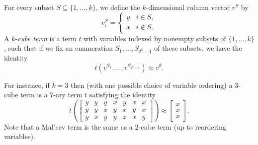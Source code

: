 \begin{defn} For every subset $S \subseteq \{1, ..., k\}$, we define the $k$-dimensional column vector $v^S$ by
\[
v^S_i = \begin{cases} y & i \in S,\\ x & i \not\in S.\end{cases}
\]
A $k$-\emph{cube term} is a term $t$ with variables indexed by nonempty subsets of $\{1, ..., k\}$, such that if we fix an enumeration $S_1, ..., S_{2^k-1}$ of these subsets, we have the identity
\[
t(v^{S_1}, ..., v^{S_{2^k-1}}) \approx v^{\emptyset}.
\]
\end{defn}

For instance, if $k = 3$ then (with one possible choice of variable ordering) a $3$-cube term is a $7$-ary term $t$ satisfying the identity
\[
t\left(\begin{bmatrix} y & y & y & x & y & x & x\\ y & y & x & y & x & y & x\\ y & x & y & y & x & x & y\end{bmatrix}\right) \approx \begin{bmatrix} x\\ x\\ x\end{bmatrix}.
\]
Note that a Mal'cev term is the same as a $2$-cube term (up to reordering variables).

